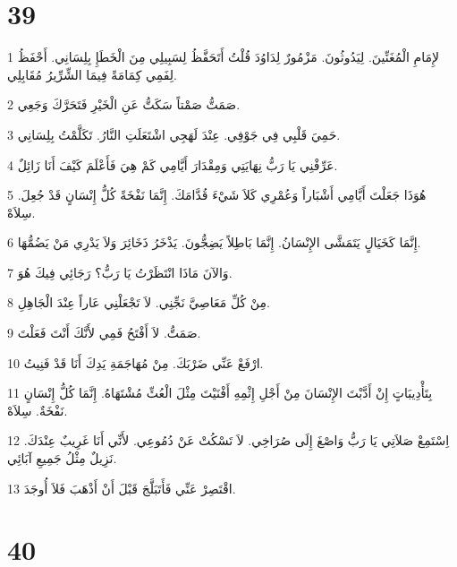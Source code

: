 \chapter{39}

\par 1 لإِمَامِ الْمُغَنِّينَ. لِيَدُوثُونَ. مَزْمُورٌ لِدَاوُدَ قُلْتُ أَتَحَفَّظُ لِسَبِيلِي مِنَ الْخَطَإِ بِلِسَانِي. أَحْفَظُ لِفَمِي كِمَامَةً فِيمَا الشِّرِّيرُ مُقَابِلِي.
\par 2 صَمَتُّ صَمْتاً سَكَتُّ عَنِ الْخَيْرِ فَتَحَرَّكَ وَجَعِي.
\par 3 حَمِيَ قَلْبِي فِي جَوْفِي. عِنْدَ لَهَجِي اشْتَعَلَتِ النَّارُ. تَكَلَّمْتُ بِلِسَانِي.
\par 4 عَرِّفْنِي يَا رَبُّ نِهَايَتِي وَمِقْدَارَ أَيَّامِي كَمْ هِيَ فَأَعْلَمَ كَيْفَ أَنَا زَائِلٌ.
\par 5 هُوَذَا جَعَلْتَ أَيَّامِي أَشْبَاراً وَعُمْرِي كَلاَ شَيْءَ قُدَّامَكَ. إِنَّمَا نَفْخَةً كُلُّ إِنْسَانٍ قَدْ جُعِلَ. سِلاَهْ.
\par 6 إِنَّمَا كَخَيَالٍ يَتَمَشَّى الإِنْسَانُ. إِنَّمَا بَاطِلاً يَضِجُّونَ. يَذْخَرُ ذَخَائِرَ وَلاَ يَدْرِي مَنْ يَضُمُّهَا.
\par 7 وَالآنَ مَاذَا انْتَظَرْتُ يَا رَبُّ؟ رَجَائِي فِيكَ هُوَ.
\par 8 مِنْ كُلِّ مَعَاصِيَّ نَجِّنِي. لاَ تَجْعَلْنِي عَاراً عِنْدَ الْجَاهِلِ.
\par 9 صَمَتُّ. لاَ أَفْتَحُ فَمِي لأَنَّكَ أَنْتَ فَعَلْتَ.
\par 10 ارْفَعْ عَنِّي ضَرْبَكَ. مِنْ مُهَاجَمَةِ يَدِكَ أَنَا قَدْ فَنِيتُ.
\par 11 بِتَأْدِيبَاتٍ إِنْ أَدَّبْتَ الإِنْسَانَ مِنْ أَجْلِ إِثْمِهِ أَفْنَيْتَ مِثْلَ الْعُثِّ مُشْتَهَاهُ. إِنَّمَا كُلُّ إِنْسَانٍ نَفْخَةٌ. سِلاَهْ.
\par 12 اِسْتَمِعْ صَلاَتِي يَا رَبُّ وَاصْغَ إِلَى صُرَاخِي. لاَ تَسْكُتْ عَنْ دُمُوعِي. لأَنِّي أَنَا غَرِيبٌ عِنْدَكَ. نَزِيلٌ مِثْلُ جَمِيعِ آبَائِي.
\par 13 اقْتَصِرْ عَنِّي فَأَتَبَلَّجَ قَبْلَ أَنْ أَذْهَبَ فَلاَ أُوجَدَ.

\chapter{40}

